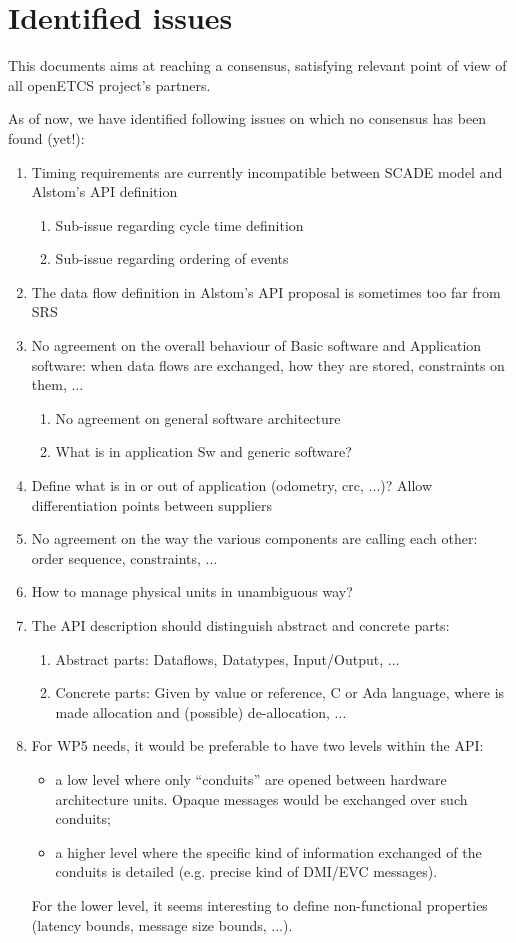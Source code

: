 \section{Identified issues}

This documents aims at reaching a consensus, satisfying relevant point
of view of all openETCS project's partners.

As of now, we have identified following issues on which no consensus
has been found (yet!):
\begin{enumerate}
\item Timing requirements are currently incompatible between SCADE
  model and Alstom's API definition
  \begin{enumerate}
  \item 	Sub-issue regarding cycle time definition
  \item 	Sub-issue regarding ordering of events
  \end{enumerate}
\item The data flow definition in Alstom's API proposal is sometimes
  too far from SRS
\item No agreement on the overall behaviour of Basic software and
  Application software: when data flows are exchanged, how they are
  stored, constraints on them, ...
  \begin{enumerate}
  \item No agreement on general software architecture
  \item What is in application Sw and generic software?
  \end{enumerate}
\item Define what is in or out of application (odometry, crc, ...)?
  Allow differentiation points between suppliers
\item No agreement on the way the various components are calling each
  other: order sequence, constraints, ...
\item How to manage physical units in unambiguous way?
\item The API description should distinguish abstract and concrete
  parts:
  \begin{enumerate}
  \item Abstract parts: Dataflows, Datatypes, Input/Output, ...
  \item Concrete parts: Given by value or reference, C or Ada
    language, where is made allocation and (possible) de-allocation,
    ...
  \end{enumerate}
\item For WP5 needs, it would be preferable to have two levels within
  the API:
  \begin{itemize}
  \item a low level where only ``conduits'' are opened between
    hardware architecture units. Opaque messages would be exchanged
    over such conduits;
  \item a higher level where the specific kind of information
    exchanged of the conduits is detailed (e.g. precise kind of
    DMI/EVC messages).
  \end{itemize}
  For the lower level, it seems interesting to define non-functional
  properties (latency bounds, message size bounds, ...).
\end{enumerate}

